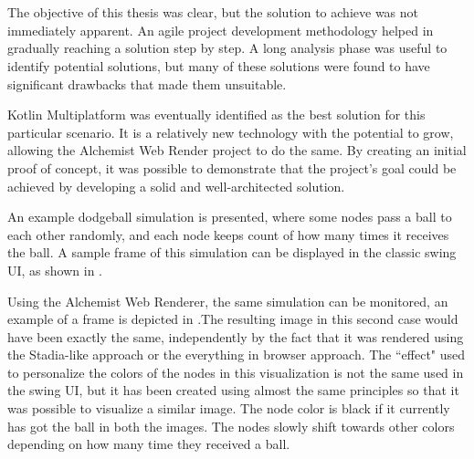 \chapter{\conclusionsname}
\label{chap:conclusions}
The objective of this thesis was clear, but the solution to achieve was not immediately apparent. An agile project development methodology helped in gradually reaching a solution step by step. A long analysis phase was useful to identify potential solutions, but many of these solutions were found to have significant drawbacks that made them unsuitable.\newline


Kotlin Multiplatform was eventually identified as the best solution for this particular scenario. It is a relatively new technology with the potential to grow, allowing the Alchemist Web Render project to do the same. By creating an initial proof of concept, it was possible to demonstrate that the project's goal could be achieved by developing a solid and well-architected solution.\newline

An example dodgeball simulation is presented, where some nodes pass a ball to each other randomly, and each node keeps count of how many times it receives the ball. A sample frame of this simulation can be displayed in the classic swing UI, as shown in .\newline


Using the Alchemist Web Renderer, the same simulation can be monitored, an example of a frame is depicted in .The resulting image in this second case would have been exactly the same, independently by the fact that it was rendered using the Stadia-like approach or the everything in browser approach. The ``effect" used to personalize the colors of the nodes in this visualization is not the same used in the swing UI, but it has been created using almost the same principles so that it was possible to visualize a similar image. The node color is black if it currently has got the ball in both the images. The nodes slowly shift towards other colors depending on how many time they received a ball.\newline

